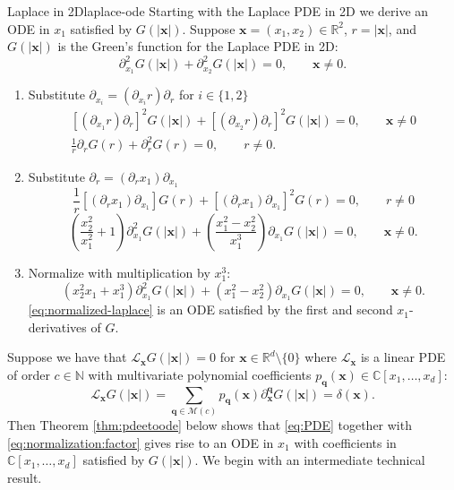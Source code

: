 \documentclass[12pt]{article}
\def\C{{\mathbb C}}
\def\N{{\mathbb N}}
\def\R{{\mathbb R}}
\let\b=\boldsymbol
\theoremstyle{definition}
\theoremstyle{plain}
\theoremstyle{definition}
\begin{document}
\begin{myexample}{Laplace in 2D}{laplace-ode}
Starting with the Laplace PDE in 2D we derive an ODE in $x_1$ satisfied by $G(|\b{x}|)$. Suppose $\b{x} = (x_1, x_2) \in \R^2$, $r = |\b{x}|$, and $G(|\b{x}|)$ is the Green's function for the Laplace PDE in 2D:
\[
\partial^2_{x_1} G(|\b{x}|) + \partial^2_{x_2} G(|\b{x}|) = 0, \qquad \b{x} \ne 0.
\]
\begin{enumerate}
 \item Substitute $\partial_{x_i} = \left(\partial_{x_i} r\right) \partial_r$ for $i \in \{1, 2\}$
\[
 \begin{aligned}
[\left(\partial_{x_1} r\right) \partial_r]^2 G(|\b{x}|) + [\left(\partial_{x_2} r\right) \partial_r]^2 G(|\b{x}|) = 0, \qquad \b{x} \ne 0 \\
\frac{1}{r} \partial_rG(r) + \partial^2_rG(r) = 0, \qquad r \ne  0 .
\end{aligned}
\]
 \item Substitute $\partial_r = \left(\partial_r x_1\right) \partial_{x_1}$
\[
\frac{1}{r} [\left(\partial_r x_1\right) \partial_{x_1}]G(r) + [\left(\partial_r x_1\right) \partial_{x_1}]^2G(r) = 0, \qquad r \ne  0
\]
\[
\left(\frac{x_2^2}{x_1^2} + 1\right)\partial^2_{x_1} G(|\b{x}|) + \left(\frac{x_1^2 - x_2^2}{x_1^3} \right)\partial_{x_1} G(|\b{x}|) = 0, \qquad  \b{x} \ne 0.
\]
\item Normalize with multiplication by $x_1^3$:
\begin{equation}
\label{eq:normalized-laplace}
\left(x_2^2 x_1 + x_1^3\right)\partial^2_{x_1} G(|\b{x}|) + \left(x_1^2 - x_2^2\right)\partial_{x_1} G(|\b{x}|) = 0, \qquad  \b{x} \ne 0.
\end{equation}
\eqref{eq:normalized-laplace} is an ODE satisfied by the first and second $x_1$-derivatives of $G$.
\end{enumerate}
\end{myexample}


Suppose we have that $\mathcal{L}_{\b{x}}G(|{\b x}|) = 0$ for $\b{x} \in \R^d \setminus \{0\}$ where $\mathcal{L}_{\b{x}}$ is a linear PDE of order $c \in \N$ with multivariate polynomial coefficients $p_{\b{q}}(\b{x}) \in \C[x_1, \dots, x_d]$:
\begin{equation}
\label{eq:PDE}
\mathcal{L}_{\b{x}} G(|{\b x}|)=\sum_{\b{q} \in \mathcal{M}(c)} p_{\b{q}}({\b x}) \partial^{\b{q}}_{{\b x}} G(|{\b x}|)  = \delta(\b{x}).
\end{equation} 
Then Theorem \ref{thm:pdeetoode} below shows that \eqref{eq:PDE} together with \eqref{eq:normalization:factor} gives rise to an ODE in $x_1$ with coefficients in $\C[x_1, \dots, x_d]$ satisfied by $G(|\b{x}|)$. We begin with an intermediate technical result.
\end{document}

